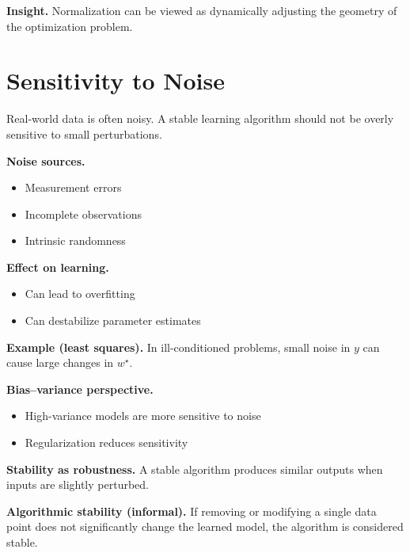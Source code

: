 \noindent
\textbf{Insight.}  
Normalization can be viewed as dynamically adjusting the geometry of the optimization problem.

\section{Sensitivity to Noise}

Real-world data is often noisy. A stable learning algorithm should not be overly sensitive to small perturbations.

\medskip

\noindent
\textbf{Noise sources.}
\begin{itemize}
    \item Measurement errors
    \item Incomplete observations
    \item Intrinsic randomness
\end{itemize}

\medskip

\noindent
\textbf{Effect on learning.}
\begin{itemize}
    \item Can lead to overfitting
    \item Can destabilize parameter estimates
\end{itemize}

\medskip

\noindent
\textbf{Example (least squares).}  
In ill-conditioned problems, small noise in $y$ can cause large changes in $w^\star$.

\medskip

\noindent
\textbf{Bias--variance perspective.}
\begin{itemize}
    \item High-variance models are more sensitive to noise
    \item Regularization reduces sensitivity
\end{itemize}

\medskip

\noindent
\textbf{Stability as robustness.}  
A stable algorithm produces similar outputs when inputs are slightly perturbed.

\medskip

\noindent
\textbf{Algorithmic stability (informal).}  
If removing or modifying a single data point does not significantly change the learned model, the algorithm is considered stable.

\medskip

